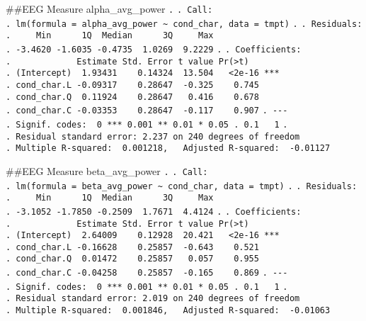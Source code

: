 \documentclass[
]{article}
\begin{document}
\#\#EEG Measure alpha\_avg\_power \texttt{.} \texttt{.\ Call:}
\texttt{.\ lm(formula\ =\ alpha\_avg\_power\ \textasciitilde{}\ cond\_char,\ data\ =\ tmpt)}
\texttt{.} \texttt{.\ Residuals:}
\texttt{.\ \ \ \ \ Min\ \ \ \ \ \ 1Q\ \ Median\ \ \ \ \ \ 3Q\ \ \ \ \ Max}
\texttt{.\ -3.4620\ -1.6035\ -0.4735\ \ 1.0269\ \ 9.2229} \texttt{.}
\texttt{.\ Coefficients:}
\texttt{.\ \ \ \ \ \ \ \ \ \ \ \ \ Estimate\ Std.\ Error\ t\ value\ Pr(\textgreater{}\textbar{}t\textbar{})}
\texttt{.\ (Intercept)\ \ 1.93431\ \ \ \ 0.14324\ \ 13.504\ \ \ \textless{}2e-16\ ***}
\texttt{.\ cond\_char.L\ -0.09317\ \ \ \ 0.28647\ \ -0.325\ \ \ \ 0.745}
\texttt{.\ cond\_char.Q\ \ 0.11924\ \ \ \ 0.28647\ \ \ 0.416\ \ \ \ 0.678}
\texttt{.\ cond\_char.C\ -0.03353\ \ \ \ 0.28647\ \ -0.117\ \ \ \ 0.907}
\texttt{.\ -\/-\/-}
\texttt{.\ Signif.\ codes:\ \ 0\ \textquotesingle{}***\textquotesingle{}\ 0.001\ \textquotesingle{}**\textquotesingle{}\ 0.01\ \textquotesingle{}*\textquotesingle{}\ 0.05\ \textquotesingle{}.\textquotesingle{}\ 0.1\ \textquotesingle{}\ \textquotesingle{}\ 1}
\texttt{.}
\texttt{.\ Residual\ standard\ error:\ 2.237\ on\ 240\ degrees\ of\ freedom}
\texttt{.\ Multiple\ R-squared:\ \ 0.001218,\ \ \ Adjusted\ R-squared:\ \ -0.01127}

\#\#EEG Measure beta\_avg\_power \texttt{.} \texttt{.\ Call:}
\texttt{.\ lm(formula\ =\ beta\_avg\_power\ \textasciitilde{}\ cond\_char,\ data\ =\ tmpt)}
\texttt{.} \texttt{.\ Residuals:}
\texttt{.\ \ \ \ \ Min\ \ \ \ \ \ 1Q\ \ Median\ \ \ \ \ \ 3Q\ \ \ \ \ Max}
\texttt{.\ -3.1052\ -1.7850\ -0.2509\ \ 1.7671\ \ 4.4124} \texttt{.}
\texttt{.\ Coefficients:}
\texttt{.\ \ \ \ \ \ \ \ \ \ \ \ \ Estimate\ Std.\ Error\ t\ value\ Pr(\textgreater{}\textbar{}t\textbar{})}
\texttt{.\ (Intercept)\ \ 2.64009\ \ \ \ 0.12928\ \ 20.421\ \ \ \textless{}2e-16\ ***}
\texttt{.\ cond\_char.L\ -0.16628\ \ \ \ 0.25857\ \ -0.643\ \ \ \ 0.521}
\texttt{.\ cond\_char.Q\ \ 0.01472\ \ \ \ 0.25857\ \ \ 0.057\ \ \ \ 0.955}
\texttt{.\ cond\_char.C\ -0.04258\ \ \ \ 0.25857\ \ -0.165\ \ \ \ 0.869}
\texttt{.\ -\/-\/-}
\texttt{.\ Signif.\ codes:\ \ 0\ \textquotesingle{}***\textquotesingle{}\ 0.001\ \textquotesingle{}**\textquotesingle{}\ 0.01\ \textquotesingle{}*\textquotesingle{}\ 0.05\ \textquotesingle{}.\textquotesingle{}\ 0.1\ \textquotesingle{}\ \textquotesingle{}\ 1}
\texttt{.}
\texttt{.\ Residual\ standard\ error:\ 2.019\ on\ 240\ degrees\ of\ freedom}
\texttt{.\ Multiple\ R-squared:\ \ 0.001846,\ \ \ Adjusted\ R-squared:\ \ -0.01063}
\end{document}
